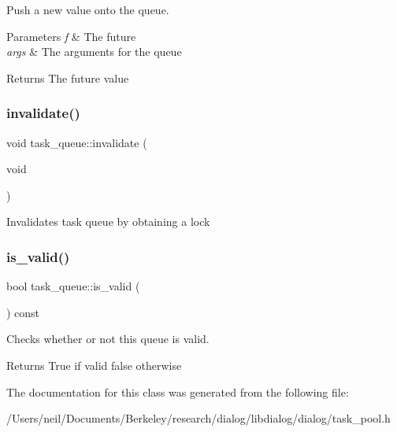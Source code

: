 Push a new value onto the queue. 
\begin{DoxyParams}{Parameters}
{\em f} & The future \\
\hline
{\em args} & The arguments for the queue \\
\hline
\end{DoxyParams}
\begin{DoxyReturn}{Returns}
The future value 
\end{DoxyReturn}
\mbox{\label{classtask__queue_a3f49e001092757da141a3067744f6af0}} 
\subsubsection{\texorpdfstring{invalidate()}{invalidate()}}
{\footnotesize\ttfamily void task\+\_\+queue\+::invalidate (\begin{DoxyParamCaption}\item[{void}]{ }\end{DoxyParamCaption})\hspace{0.3cm}{\ttfamily [inline]}}

Invalidates task queue by obtaining a lock \mbox{\label{classtask__queue_a75e723aa9cc68a264d63b40b3ef3f280}} 
\subsubsection{\texorpdfstring{is\+\_\+valid()}{is\_valid()}}
{\footnotesize\ttfamily bool task\+\_\+queue\+::is\+\_\+valid (\begin{DoxyParamCaption}{ }\end{DoxyParamCaption}) const\hspace{0.3cm}{\ttfamily [inline]}}

Checks whether or not this queue is valid. \begin{DoxyReturn}{Returns}
True if valid false otherwise 
\end{DoxyReturn}


The documentation for this class was generated from the following file\+:\begin{DoxyCompactItemize}
\item 
/\+Users/neil/\+Documents/\+Berkeley/research/dialog/libdialog/dialog/task\+\_\+pool.\+h\end{DoxyCompactItemize}
